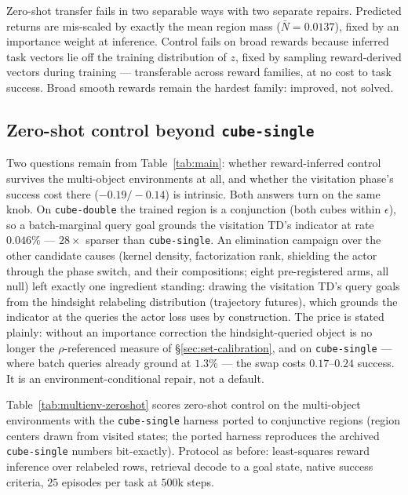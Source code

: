 \documentclass{article}
\begin{document}
\begin{finding}
Zero-shot transfer fails in two separable ways with two separate repairs.
Predicted returns are mis-scaled by exactly the mean region mass
($\bar N=0.0137$), fixed by an importance weight at inference. Control fails on
broad rewards because inferred task vectors lie off the training distribution
of $z$, fixed by sampling reward-derived vectors during training ---
transferable across reward families, at no cost to task success. Broad smooth
rewards remain the hardest family: improved, not solved.
\end{finding}

\subsection{Zero-shot control beyond \texttt{cube-single}}
\label{sec:multienv-zeroshot}

Two questions remain from Table~\ref{tab:main}: whether reward-inferred
control survives the multi-object environments at all, and whether the
visitation phase's success cost there ($-0.19/-0.14$) is intrinsic. Both
answers turn on the same knob. On \texttt{cube-double} the trained region is a
conjunction (both cubes within $\epsilon$), so a batch-marginal query goal
grounds the visitation TD's indicator at rate $0.046\%$ --- $28\times$ sparser
than \texttt{cube-single}. An elimination campaign over the other candidate
causes (kernel density, factorization rank, shielding the actor through the
phase switch, and their compositions; eight pre-registered arms, all null)
left exactly one ingredient standing: drawing the visitation TD's query goals
from the hindsight relabeling distribution (trajectory futures), which grounds
the indicator at the queries the actor loss uses by construction. The price is
stated plainly: without an importance correction the hindsight-queried object
is no longer the $\rho$-referenced measure of \S\ref{sec:set-calibration}, and
on \texttt{cube-single} --- where batch queries already ground at $1.3\%$ ---
the swap costs $0.17$--$0.24$ success. It is an environment-conditional
repair, not a default.

Table~\ref{tab:multienv-zeroshot} scores zero-shot control on the multi-object
environments with the \texttt{cube-single} harness ported to conjunctive
regions (region centers drawn from visited states; the ported harness
reproduces the archived \texttt{cube-single} numbers bit-exactly). Protocol as
before: least-squares reward inference over relabeled rows, retrieval decode
to a goal state, native success criteria, $25$ episodes per task at $500$k
steps.
\end{document}
